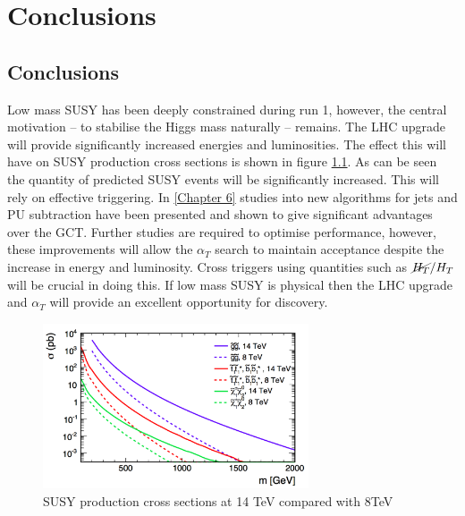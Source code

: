 
\chapter{Conclusions} %

\label{Chapter6} %



\section{Conclusions}
Low mass SUSY has been deeply constrained during run 1, however, the central motivation -- to stabilise the Higgs mass naturally -- remains. The LHC upgrade will provide significantly increased energies and luminosities. The effect this will have on SUSY production cross sections is shown in figure \ref{snow}\cite{ProjectedCx}. As can be seen the quantity of predicted SUSY events will be significantly increased. This will rely on effective triggering. In \ref{Chapter 6} studies into new algorithms for jets and PU subtraction have been presented and shown to give significant advantages over the GCT. Further studies are required to optimise performance, however, these improvements will allow the $\alpha_T$ search to maintain acceptance despite the increase in energy and luminosity. Cross triggers using quantities such as $\cancel{H_T}/{H_T}$ will be crucial in doing this. If low mass SUSY is physical then the LHC upgrade and $\alpha_T$ will provide an excellent opportunity for discovery. 
\begin{figure}
\centering
    \includegraphics[width=0.7\textwidth]{Figures/snowmass.png}
  \caption{SUSY production cross sections at 14 TeV compared with 8TeV}
  \label{snow}
\end{figure}


